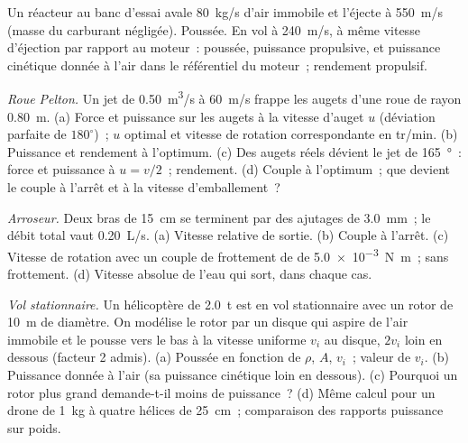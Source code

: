 \begin{exercise}[$\star$]\label{exo:b2:flow-balances:4}
Un réacteur au banc d'essai avale \qty{80}{kg/s} d'air immobile et
l'éjecte à \qty{550}{m/s} (masse du carburant négligée). Poussée. En vol
à \qty{240}{m/s}, à même vitesse d'éjection par rapport au moteur~: poussée,
puissance propulsive, et puissance cinétique donnée à l'air dans le référentiel du
moteur~; rendement propulsif.
\end{exercise}

\begin{exercise}[$\star\star$]\label{exo:b2:flow-balances:5}
\emph{Roue Pelton.} Un jet de \qty{0.50}{m^3/s} à \qty{60}{m/s} frappe les
augets d'une roue de rayon \qty{0.80}{m}. (a) Force et puissance sur les
augets à la vitesse d'auget $u$ (déviation parfaite de $180^\circ$)~; $u$ optimal
et vitesse de rotation correspondante en tr/min. (b) Puissance et rendement
à l'optimum. (c) Des augets réels dévient le jet de \qty{165}{\degree}~:
force et puissance à $u = v/2$~; rendement. (d) Couple à l'optimum~;
que devient le couple à l'arrêt et à la vitesse d'emballement~?
\end{exercise}

\begin{exercise}[$\star\star$]\label{exo:b2:flow-balances:6}
\emph{Arroseur.} Deux bras de \qty{15}{cm} se terminent par des ajutages de \qty{3.0}{mm}~;
le débit total vaut \qty{0.20}{L/s}. (a) Vitesse relative de sortie. (b) Couple à
l'arrêt. (c) Vitesse de rotation avec un couple de frottement de  de
\qty{5.0e-3}{N.m}~;  sans frottement. (d) Vitesse absolue
de l'eau qui sort, dans chaque cas.
\end{exercise}

\begin{exercise}[$\star\star$]\label{exo:b2:flow-balances:7}
\emph{Vol stationnaire.} Un hélicoptère de \qty{2.0}{t} est en vol stationnaire avec un rotor de
\qty{10}{m} de diamètre. On modélise le rotor par un disque qui aspire de l'air immobile
et le pousse vers le bas à la vitesse uniforme $v_i$ au disque, $2v_i$ loin
en dessous (facteur 2 admis). (a) Poussée en fonction de $\rho$, $A$, $v_i$~;
valeur de $v_i$. (b) Puissance donnée à l'air (sa puissance cinétique loin
en dessous). (c) Pourquoi un rotor plus grand demande-t-il moins de puissance~? (d) Même
calcul pour un drone de \qty{1}{kg} à quatre hélices de \qty{25}{cm}~;
comparaison des rapports puissance sur poids.
\end{exercise}

